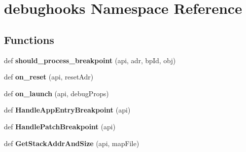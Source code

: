 \hypertarget{namespacedebughooks}{}\section{debughooks Namespace Reference}
\label{namespacedebughooks}
\subsection*{Functions}
\begin{DoxyCompactItemize}
\item 
\mbox{\label{namespacedebughooks_acdaada684f14959e258414534d569f71}} 
def {\bfseries should\+\_\+process\+\_\+breakpoint} (api, adr, bp\+Id, obj)
\item 
\mbox{\label{namespacedebughooks_a0ee6ce3e0aacdd1e5758492f69f995f8}} 
def {\bfseries on\+\_\+reset} (api, reset\+Adr)
\item 
\mbox{\label{namespacedebughooks_ac7b06df66dc219922f1ad5a6734f71c6}} 
def {\bfseries on\+\_\+launch} (api, debug\+Props)
\item 
\mbox{\label{namespacedebughooks_a71d3491d80d320fc8f85383489af96ec}} 
def {\bfseries Handle\+App\+Entry\+Breakpoint} (api)
\item 
\mbox{\label{namespacedebughooks_a673ca6fc076f03549c0078ee764a5786}} 
def {\bfseries Handle\+Patch\+Breakpoint} (api)
\item 
\mbox{\label{namespacedebughooks_a80cb4755d936e703c396376b7d9b05b5}} 
def {\bfseries Get\+Stack\+Addr\+And\+Size} (api, map\+File)
\end{DoxyCompactItemize}
